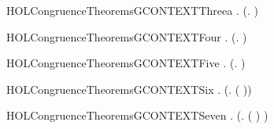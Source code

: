 \begin{SaveVerbatim}{HOLCongruenceTheoremsGCONTEXTThreea}
\HOLTokenTurnstile{} \HOLSymConst{\HOLTokenForall{}}.  (\HOLTokenLambda{}. )
\end{SaveVerbatim}
\newcommand{\HOLCongruenceTheoremsGCONTEXTThreea}{\UseVerbatim{HOLCongruenceTheoremsGCONTEXTThreea}}
\begin{SaveVerbatim}{HOLCongruenceTheoremsGCONTEXTFour}
\HOLTokenTurnstile{} \HOLSymConst{\HOLTokenForall{}}   .
         \HOLSymConst{\HOLTokenConj{}}   \HOLSymConst{\HOLTokenImp{}}
        (\HOLTokenLambda{}.   \HOLSymConst{\ensuremath{+}}  )
\end{SaveVerbatim}
\newcommand{\HOLCongruenceTheoremsGCONTEXTFour}{\UseVerbatim{HOLCongruenceTheoremsGCONTEXTFour}}
\begin{SaveVerbatim}{HOLCongruenceTheoremsGCONTEXTFive}
\HOLTokenTurnstile{} \HOLSymConst{\HOLTokenForall{}} .
         \HOLSymConst{\HOLTokenConj{}}   \HOLSymConst{\HOLTokenImp{}}  (\HOLTokenLambda{}.   \HOLSymConst{\ensuremath{\parallel}}  )
\end{SaveVerbatim}
\newcommand{\HOLCongruenceTheoremsGCONTEXTFive}{\UseVerbatim{HOLCongruenceTheoremsGCONTEXTFive}}
\begin{SaveVerbatim}{HOLCongruenceTheoremsGCONTEXTSix}
\HOLTokenTurnstile{} \HOLSymConst{\HOLTokenForall{}} .   \HOLSymConst{\HOLTokenImp{}}  (\HOLTokenLambda{}. \HOLConst{\ensuremath{\nu}}  ( ))
\end{SaveVerbatim}
\newcommand{\HOLCongruenceTheoremsGCONTEXTSix}{\UseVerbatim{HOLCongruenceTheoremsGCONTEXTSix}}
\begin{SaveVerbatim}{HOLCongruenceTheoremsGCONTEXTSeven}
\HOLTokenTurnstile{} \HOLSymConst{\HOLTokenForall{}} .   \HOLSymConst{\HOLTokenImp{}}  (\HOLTokenLambda{}.  ( ) )
\end{SaveVerbatim}
